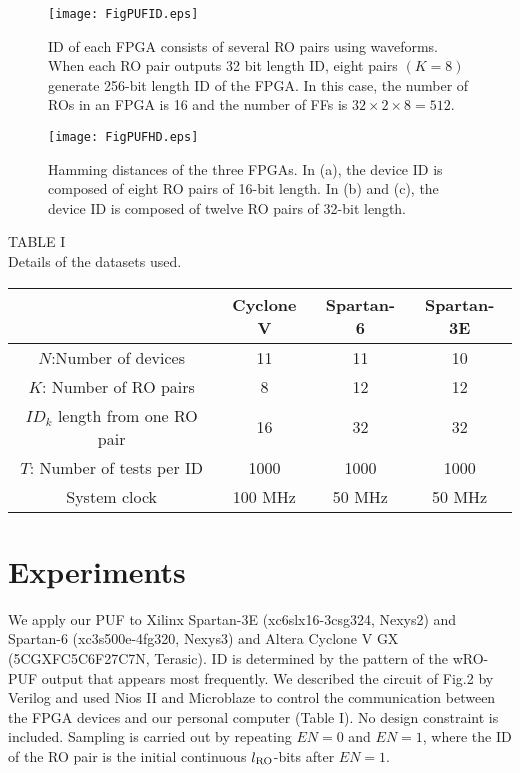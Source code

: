 ﻿\documentclass[aps,preprint,prb,superscriptaddress,amsmath,showpacs,tightenlines]{revtex4}
\begin{document}
\begin{figure}[t]
\begin{center}\texttt{[image: FigPUFID.eps]}
\caption{ 
ID of each FPGA consists of several  RO pairs using waveforms. 
When each RO pair outputs
32 bit length ID, eight pairs $(K=8)$ generate 256-bit length ID of the FPGA. In this case, the number 
of ROs in an FPGA is 16 and the number of FFs is $32\times 2 \times 8=512$.} 
\label{ID}
\end{center}
\end{figure}

\begin{figure}
\centering
\texttt{[image: FigPUFHD.eps]}
\caption{
Hamming distances of the three FPGAs. 
In (a), the device ID  is composed of eight RO pairs of 16-bit length.
In (b) and (c), the device ID is composed of twelve RO pairs of 32-bit length.} 
\label{HD}
\end{figure}


\begin{table}
\begin{center}
TABLE I\\ 
{ Details of the datasets used.} 
\end{center}
\begin{tabular}{|c|c|c|c|}\hline
&  Cyclone V &  Spartan-6 &  Spartan-3E \\ \hline
$N$:Number of devices
& 11 
& 11 
& 10 
\\
$K$: Number of RO pairs
& 8
& 12
& 12
\\
$ID_k$ length from one RO pair
& 16
& 32
& 32
\\
$T$: Number of tests per ID
& 1000
& 1000
& 1000
\\
System clock
& 100 MHz 
& 50 MHz 
& 50 MHz 
\\ \hline
\end{tabular}
\end{table}
\section{Experiments}
We apply our PUF to Xilinx Spartan-3E (xc6slx16-3csg324, Nexys2) and Spartan-6 (xc3s500e-4fg320, Nexys3)
and Altera Cyclone V GX (5CGXFC5C6F27C7N, Terasic).
ID is determined by the pattern of the wRO-PUF output that appears most frequently.
We described the circuit of Fig.2 by Verilog and used Nios II and Microblaze to 
control the communication between the FPGA devices and our personal  computer (Table I).
No design constraint is included.
Sampling is carried out by repeating $EN=0$ and $EN=1$, 
where the ID of the RO pair is the initial continuous $l_{\rm RO}$-bits after $EN=1$.
\end{document}
